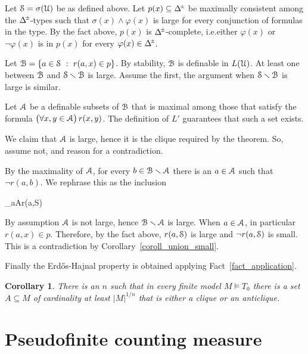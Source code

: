 \documentclass[10pt,oneside, openany]{book}
\def\A{\forall}
\def\models{\vDash}
\def\pmDelta{\Delta\hskip-.3ex\raisebox{1ex}{\tiny$\pm$}}
\def\sm{\smallsetminus}
\def\Aa{\EuScript A}
\def\U{\EuScript U}
\def\B{\EuScript B}
\def\S{\EuScript S}
\def\phi{\varphi}
\newcounter{thm}[chapter]
\theoremstyle{mio}
\newtheorem{corollary}[thm]{Corollary}
\theoremstyle{liscio}
\def\QED{\noindent\nolinebreak[4]\hfill\rlap{\ \ $\Box$}\medskip}
\renewenvironment{proof}[1][Proof]%
{\smallskip\begin{trivlist}\item[\hskip\labelsep {\bf #1}]}
{\QED\end{trivlist}}
\begin{document}
\begin{proof}
  Let $\S=\sigma(\U)$ be as defined above.
  Let $p(x)\subseteq\pmDelta$ be maximally consistent among the $\pmDelta$-types such that $\sigma(x)\wedge\phi(x)$ is large for every conjunction of formulas in the type.
  By the fact above, $p(x)$ is $\pmDelta$-complete, i.e.\@ either $\phi(x)$ or $\neg\phi(x)$ is in $p(x)$ for every $\phi(x)\in\pmDelta$.


  Let $\B=\{a\in\S\ :\ r(a,x)\in p\}$.
  By stability, $\B$ is definable in $L(\U)$.
  At least one between $\B$ and $\S\sm\B$ is large.
  Assume the first, the argument when $\S\sm\B$ is large is similar.

  Let $\Aa$ be a definable subsets of $\B$ that is maximal among those that satisfy the formula $\big(\A x,y\in\Aa\big)\,r(x,y)$.
  The definition of $L'$ guarantees that such a set exists.
  
  We claim that $\Aa$ is large, hence it is the clique required by the theorem.
  So, assume not, and reason for a contradiction.

  By the maximality of $\Aa$, for every $b\in\B\sm\Aa$ there is an $a\in\Aa$ such that $\neg r(a,b)$.
  We rephrase this as the inclusion

  \ceq{\hfill\B\sm\Aa}
  {\subseteq}
  {\bigcup_{a\in\Aa}\neg r(a,\S)}

  By assumption $\Aa$ is not large, hence $\B\sm\Aa$ is large.
  When $a\in\Aa$, in particular $r(a,x)\in p$.
  Therefore, by the fact above, $r(a,\S)$ is large and $\neg r(a,\S)$ is small.
  This is a contradiction by Corollary~\ref{coroll_union_small}.
\end{proof}

Finally the Erd\H{o}s-Hajnal property is obtained applying Fact~\ref{fact_application}.

\begin{corollary}
  There is an $n$ such that in every finite model $M\models T_0$ there is a set $A\subseteq M$ of cardinality at least $|M|^{1/n}$ that is either a clique or an anticlique.\QED
\end{corollary}


\section{Pseudofinite counting measure}
\end{document}
